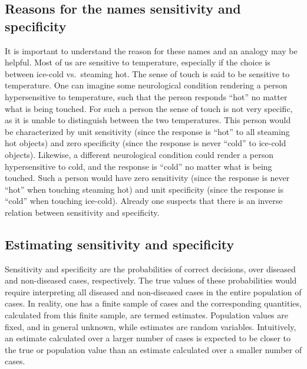 \documentclass[
]{book}
\begin{document}
\hypertarget{reasons-for-the-names-sensitivity-and-specificity}{%
\subsection{Reasons for the names sensitivity and specificity}\label{reasons-for-the-names-sensitivity-and-specificity}}

It is important to understand the reason for these names and an analogy may be helpful. Most of us are sensitive to temperature, especially if the choice is between ice-cold vs.~steaming hot. The sense of touch is said to be sensitive to temperature. One can imagine some neurological condition rendering a person hypersensitive to temperature, such that the person responds ``hot'' no matter what is being touched. For such a person the sense of touch is not very specific, as it is unable to distinguish between the two temperatures. This person would be characterized by unit sensitivity (since the response is ``hot'' to all steaming hot objects) and zero specificity (since the response is never ``cold'' to ice-cold objects). Likewise, a different neurological condition could render a person hypersensitive to cold, and the response is ``cold'' no matter what is being touched. Such a person would have zero sensitivity (since the response is never ``hot'' when touching steaming hot) and unit specificity (since the response is ``cold'' when touching ice-cold). Already one suspects that there is an inverse relation between sensitivity and specificity.

\hypertarget{estimating-sensitivity-and-specificity}{%
\subsection{Estimating sensitivity and specificity}\label{estimating-sensitivity-and-specificity}}

Sensitivity and specificity are the probabilities of correct decisions, over diseased and non-diseased cases, respectively. The true values of these probabilities would require interpreting all diseased and non-diseased cases in the entire population of cases. In reality, one has a finite sample of cases and the corresponding quantities, calculated from this finite sample, are termed estimates. Population values are fixed, and in general unknown, while estimates are random variables. Intuitively, an estimate calculated over a larger number of cases is expected to be closer to the true or population value than an estimate calculated over a smaller number of cases.
\end{document}
